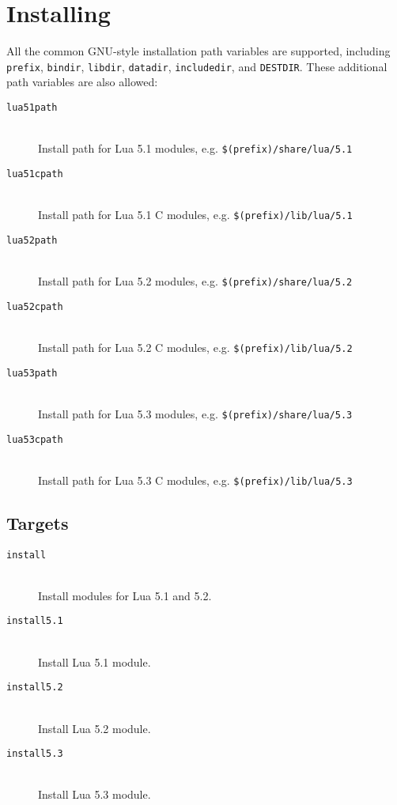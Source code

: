 \documentclass[11pt, oneside]{memoir}
\begin{document}
\section{Installing}

All the common GNU-style installation path variables are supported, including \texttt{prefix}, \texttt{bindir}, \texttt{libdir}, \texttt{datadir}, \texttt{includedir}, and \texttt{DESTDIR}. These additional path variables are also allowed:

\begin{description}

\item[\texttt{lua51path}]  \hfill \\
Install path for Lua 5.1 modules, e.g. \texttt{\$(prefix)/share/lua/5.1}

\item[\texttt{lua51cpath}]  \hfill \\
Install path for Lua 5.1 C modules, e.g. \texttt{\$(prefix)/lib/lua/5.1}

\item[\texttt{lua52path}]  \hfill \\
Install path for Lua 5.2 modules, e.g. \texttt{\$(prefix)/share/lua/5.2}

\item[\texttt{lua52cpath}]  \hfill \\
Install path for Lua 5.2 C modules, e.g. \texttt{\$(prefix)/lib/lua/5.2}

\item[\texttt{lua53path}]  \hfill \\
Install path for Lua 5.3 modules, e.g. \texttt{\$(prefix)/share/lua/5.3}

\item[\texttt{lua53cpath}]  \hfill \\
Install path for Lua 5.3 C modules, e.g. \texttt{\$(prefix)/lib/lua/5.3}

\end{description}

\subsection{Targets}

\begin{description}

\item[\texttt{install}] \hfill \\
Install modules for Lua 5.1 and 5.2.

\item[\texttt{install5.1}] \hfill \\
Install Lua 5.1 module.

\item[\texttt{install5.2}] \hfill \\
Install Lua 5.2 module.

\item[\texttt{install5.3}] \hfill \\
Install Lua 5.3 module.

\end{description}
\end{document}
